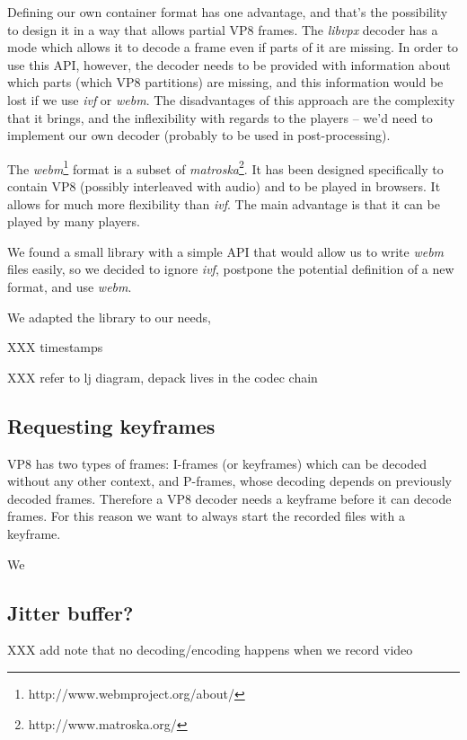 \documentclass[twoside,openright,a4paper,12pt,english]{article}
\begin{document}
Defining our own container format has one advantage, and that's the possibility
to design it in a way that allows partial VP8 frames. The \emph{libvpx} decoder
has a mode which allows it to decode a frame even if parts of it are missing.
In order to use this API, however, the decoder needs to be provided with
information about which parts (which VP8 partitions) are missing, and this
information would be lost if we use \emph{ivf} or \emph{webm}. The
disadvantages of this approach are the complexity that it brings, and the
inflexibility with regards to the players -- we'd need to implement our own
decoder (probably to be used in post-processing).

The \emph{webm}\footnote{http://www.webmproject.org/about/} format is a subset of
\emph{matroska}\footnote{http://www.matroska.org/}. It has been designed
specifically to contain VP8 (possibly interleaved with audio) and to be played
in browsers. It allows for much more flexibility than \emph{ivf}. The main advantage
is that it can be played by many players.

\smallskip
We found a small library with a simple API that would allow us to write \emph{webm} files
easily, so we decided to ignore \emph{ivf}, postpone the potential
definition of a new format, and use \emph{webm}. 

We adapted the library to our needs, 

XXX timestamps

XXX refer to lj diagram, depack lives in the codec chain

\subsection{Requesting keyframes}
VP8 has two types of frames: I-frames (or keyframes) which can be decoded
without any other context, and P-frames, whose decoding depends on previously
decoded frames. Therefore a VP8 decoder needs a keyframe before it can decode
frames. For this reason we want to always start the recorded files with a
keyframe.

We 

\subsection{Jitter buffer?}
\label{video-jb}




XXX add note that no decoding/encoding happens when we record video
\end{document}
